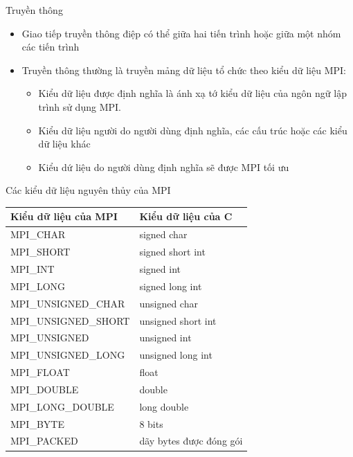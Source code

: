 \documentclass[10pt]{beamer}
\theoremstyle{remark}
\numberwithin{algocf}{section}
\numberwithin{equation}{section}
\numberwithin{dl}{section}
\numberwithin{figure}{section}
\begin{document}
\begin{frame}{Truyền thông}
    \begin{itemize}
        \item Giao tiếp truyền thông điệp có thể giữa hai tiến trình hoặc giữa một nhóm các tiến trình
        \item Truyền thông thường là truyền mảng dữ liệu tổ chức theo kiểu dữ liệu MPI:
        \begin{itemize}
            \item Kiểu dữ liệu được định nghĩa là ánh xạ tớ kiểu dữ liệu của ngôn ngữ lập trình sử dụng MPI.
            \item Kiểu dữ liệu người do người dùng định nghĩa, các cấu trúc hoặc các kiểu dữ liệu khác
            \item Kiểu dứ liệu do người dùng định nghĩa sẽ được MPI tối ưu
        \end{itemize}
    \end{itemize}
\end{frame}

\begin{frame}{Các kiểu dữ liệu nguyên thủy của MPI}
    \begin{table}[H]
        \centering
        \begin{tabular}{ll}
            \hline
            Kiểu dữ liệu của MPI & Kiểu dữ liệu của C \\
            \hline
            MPI\_CHAR & signed char \\
            MPI\_SHORT & signed short int \\
            MPI\_INT & signed int \\
            MPI\_LONG & signed long int \\
            MPI\_UNSIGNED\_CHAR & unsigned char \\
            MPI\_UNSIGNED\_SHORT & unsigned short int \\
            MPI\_UNSIGNED & unsigned int \\
            MPI\_UNSIGNED\_LONG & unsigned long int \\
            MPI\_FLOAT & float \\
            MPI\_DOUBLE & double \\
            MPI\_LONG\_DOUBLE & long double \\
            MPI\_BYTE & 8 bits \\
            MPI\_PACKED & dãy bytes được đóng gói \\
            \hline
        \end{tabular}
    \end{table}
\end{frame}
\end{document}
